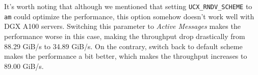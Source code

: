 \documentclass{article}
\begin{document}
It's worth noting that although we mentioned that setting \texttt{UCX\_RNDV\_SCHEME} to \texttt{am} could optimize the performance, this option somehow doesn't work well with DGX A100 servers. Switching this parameter to \textit{Active Messages} makes the performance worse in this case, making the throughput drop drastically from 88.29 GiB/s to 34.89 GiB/s. On the contrary, switch back to default scheme makes the performance a bit better, which makes the throughput increases to 89.00 GiB/s.


\end{document}

